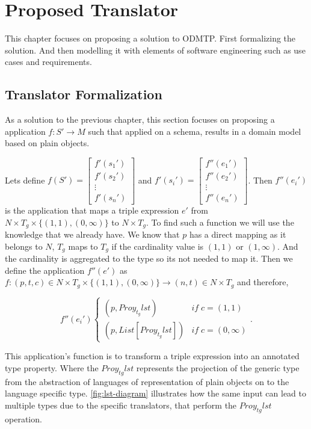 \chapter{Proposed Translator}
\label{ch:proposed-translator}

This chapter focuses on proposing a solution to ODMTP.
First formalizing the solution. And then modelling it
with elements of software engineering such as use cases
and requirements.

\section{Translator Formalization}
As a solution to the previous chapter, this section focuses on
proposing a application $f : S' \rightarrow M$ such that
applied on a schema, results in a domain model based on
plain objects.

Lets define $f(S') = \begin{bmatrix}f'(s_1')\\ f'(s_2')\\ \vdots\\ f'(s_n')\end{bmatrix}$ and
$f'(s_i') = \begin{bmatrix}f''(e_1')\\ f''(e_2')\\ \vdots\\ f''(e_n')\end{bmatrix}$. Then $f''(e_i')$
is the application that maps a triple expression $e'$ from $N \times T_{g} \times \{(1,1),(0,\infty)\}$
to $N \times T_g$. To find such a function we will use the knowledge that we already have.
We know that $p$ has a direct mapping as it belongs to $N$, $T_g$ maps to $T_g$ if
the cardinality value is $(1,1)$ or $(1, \infty)$. And the cardinality is aggregated to the type
so its not needed to map it. Then we define the application $f''(e')$ as $f:(p,t,c) \in N \times T_g \times \{(1,1), (0,\infty)\} \rightarrow (n,t)\in N \times T_g$
and therefore,

\begin{equation}
f''(e_i')
\begin{cases}
    (p,Proy_{t_g}lst) & if \; c=(1,1) \\
    (p,List[Proy_{t_g}lst]) & if \; c=(0,\infty)
\end{cases}.
\end{equation}

This application's function is to transform a triple expression
into an annotated type property. Where the $Proy_{tg}lst$ represents
the projection of the generic type from the abstraction of languages
of representation of plain objects on to the language specific type.
\cref{fig:lst-diagram} illustrates how the same input can lead to
multiple types due to the specific translators, that perform the 
$Proy_{tg}lst$ operation.

